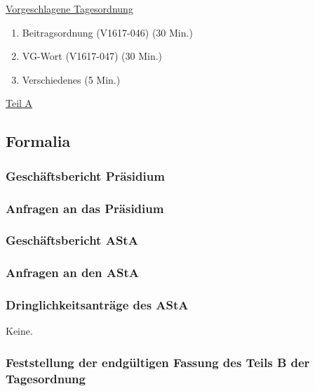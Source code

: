 \documentclass[ngerman,headheight=70pt]{scrartcl}
\begin{document}
    \newpage
    \underline{Vorgeschlagene Tagesordnung}
    \begin{enumerate}[label={\textbf{Top \theenumi}},leftmargin=*]
        \item Beitragsordnung (V1617-046) (30 Min.)
        \item VG-Wort (V1617-047) (30 Min.)
        \item Verschiedenes (5 Min.)
    \end{enumerate}

    \newpage


    {\Large \underline{Teil A}}

    \subsection{Formalia}


    \subsubsection{Geschäftsbericht Präsidium}


    \subsubsection{Anfragen an das Präsidium}


    \subsubsection{Geschäftsbericht AStA}

    \subsubsection{Anfragen an den AStA}



    \subsubsection{Dringlichkeitsanträge des AStA}

    Keine.


    \subsubsection{Feststellung der endgültigen Fassung des Teils B der Tagesordnung}
\end{document}
